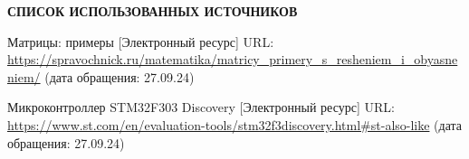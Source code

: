 \renewcommand{\bibname}{}
\begin{thebibliography}{6}
\renewcommand{\bibname}{СПИСОК ИСПОЛЬЗОВАННЫХ ИСТОЧНИКОВ}
\begin{center}
    \textbf{\bibname}
\end{center}
    Матрицы: примеры [Электронный ресурс]
        URL: \url{https://spravochnick.ru/matematika/matricy_primery_s_resheniem_i_obyasneniem/}
        (дата обращения: 27.09.24)

    Микроконтроллер STM32F303 Discovery [Электронный ресурс]
        URL: \url{https://www.st.com/en/evaluation-tools/stm32f3discovery.html#st-also-like}
        (дата обращения: 27.09.24)
\end{thebibliography}
